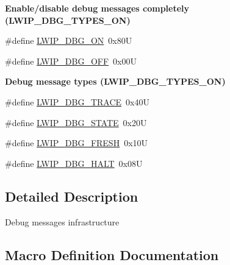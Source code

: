 \begin{Indent}\textbf{ Enable/disable debug messages completely (L\+W\+I\+P\+\_\+\+D\+B\+G\+\_\+\+T\+Y\+P\+E\+S\+\_\+\+ON)}\par
\begin{DoxyCompactItemize}
\item 
\#define \hyperlink{group__debugging__levels_ga9e31b7cbbc8f46af8e62b548079acd4e}{L\+W\+I\+P\+\_\+\+D\+B\+G\+\_\+\+ON}~0x80U
\item 
\#define \hyperlink{group__debugging__levels_gadab1cdc3f45939a3a5c9a3d7e04987e1}{L\+W\+I\+P\+\_\+\+D\+B\+G\+\_\+\+O\+FF}~0x00U
\end{DoxyCompactItemize}
\end{Indent}
\begin{Indent}\textbf{ Debug message types (L\+W\+I\+P\+\_\+\+D\+B\+G\+\_\+\+T\+Y\+P\+E\+S\+\_\+\+ON)}\par
\begin{DoxyCompactItemize}
\item 
\#define \hyperlink{group__debugging__levels_ga988147559b78642ac881815b66023646}{L\+W\+I\+P\+\_\+\+D\+B\+G\+\_\+\+T\+R\+A\+CE}~0x40U
\item 
\#define \hyperlink{group__debugging__levels_ga511ee3deb3240635f5ec6a1709c6d741}{L\+W\+I\+P\+\_\+\+D\+B\+G\+\_\+\+S\+T\+A\+TE}~0x20U
\item 
\#define \hyperlink{group__debugging__levels_ga7d44d1804fa5e747aed86816e2a6cae0}{L\+W\+I\+P\+\_\+\+D\+B\+G\+\_\+\+F\+R\+E\+SH}~0x10U
\item 
\#define \hyperlink{group__debugging__levels_gab0a296414983155b30ad51871606b90f}{L\+W\+I\+P\+\_\+\+D\+B\+G\+\_\+\+H\+A\+LT}~0x08U
\end{DoxyCompactItemize}
\end{Indent}


\subsection{Detailed Description}
Debug messages infrastructure 

\subsection{Macro Definition Documentation}
\mbox{\label{openmote-cc2538_2lwip_2src_2include_2lwip_2debug_8h_a94ad086267808462beae2b38f91996ed}} 

